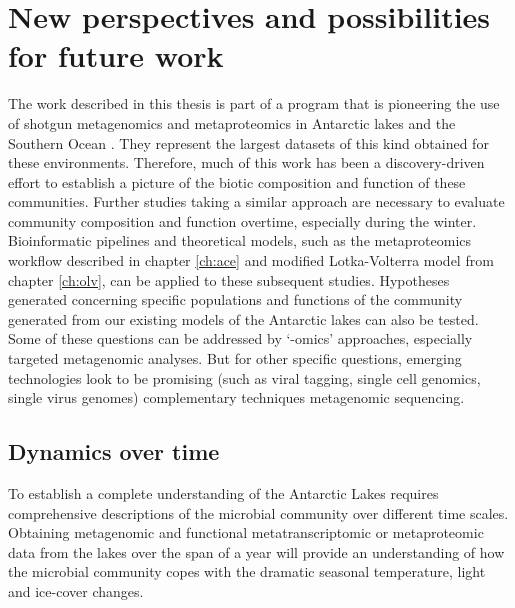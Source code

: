 \section{New perspectives and possibilities for future work}
The work described in this thesis is part of a program that is pioneering the use of shotgun metagenomics and metaproteomics in Antarctic lakes \cite{Ng2010, Lauro2011, Yau2011} and the Southern Ocean \cite{Wilkins2012b, Grzymski2012, Williams2012a, Williams2012b}.
They represent the largest datasets of this kind obtained for these environments.
Therefore, much of this work has been a discovery-driven effort to establish a picture of the biotic composition and function of these communities.
Further studies taking a similar approach are necessary to evaluate community composition and function overtime, especially during the winter.
Bioinformatic pipelines and theoretical models, such as the metaproteomics workflow described in chapter \ref{ch:ace} and modified Lotka-Volterra model from chapter \ref{ch:olv}, can be applied to these subsequent studies.
Hypotheses generated concerning specific populations and functions of the community generated from our existing models of the Antarctic lakes can also be tested.
Some of these questions can be addressed by `-omics' approaches, especially targeted metagenomic analyses.
But for other specific questions, emerging technologies look to be promising (such as viral tagging, single cell genomics, single virus genomes) complementary techniques metagenomic sequencing.



\subsection{Dynamics over time}
To establish a complete understanding of the Antarctic Lakes requires comprehensive descriptions of the microbial community over different time scales.
Obtaining metagenomic and functional metatranscriptomic or metaproteomic data from the lakes over the span of a year will provide an understanding of how the microbial community copes with the dramatic seasonal temperature, light and ice-cover changes.

